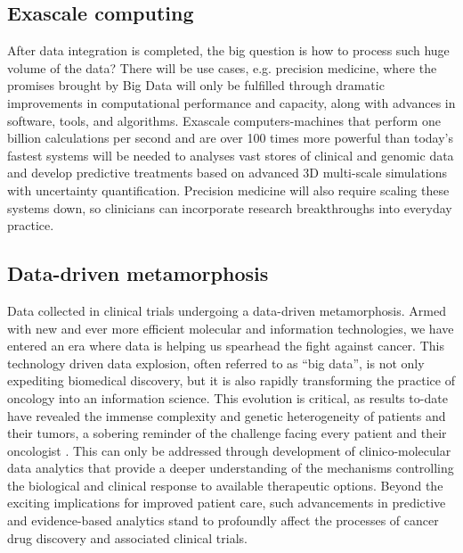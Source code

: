 \documentclass[sigconf]{acmart}
\begin{document}
\subsection{Exascale computing}
After data integration is completed, the big question is how to process
such huge volume of the data? There will be use cases, e.g. precision
medicine, where the promises brought by Big Data will only be fulfilled
through dramatic improvements in computational performance and capacity,
along with advances in software, tools, and algorithms. Exascale
computers-machines that perform one billion calculations per second and
are over 100 times more powerful than today's fastest systems will be
needed to analyses vast stores of clinical and genomic data and develop
predictive treatments based on advanced 3D multi-scale simulations with
uncertainty quantification. Precision medicine will also require scaling
these systems down, so clinicians can incorporate research breakthroughs
into everyday practice\cite{TR04}.

\subsection{Data-driven metamorphosis}
Data collected in clinical trials undergoing a data-driven 
metamorphosis. Armed with new and ever more efficient molecular 
and information technologies, we have entered an era where data is
helping us spearhead the fight against cancer. This technology 
driven data explosion, often referred to as ``big data'', is not only
expediting biomedical discovery, but it is also rapidly transforming
the practice of oncology into an information science. This evolution
is critical, as results to-date have revealed the immense complexity
and genetic heterogeneity of patients and their tumors, a sobering
reminder of the challenge facing every patient and their oncologist
. This can only be addressed through development of clinico-molecular
data analytics that provide a deeper understanding of the mechanisms
controlling the biological and clinical response to available 
therapeutic options. Beyond the exciting implications for improved 
patient care, such advancements in predictive and evidence-based 
analytics stand to profoundly affect the processes of cancer drug
discovery and associated clinical trials\cite{TR01}.
\end{document}
